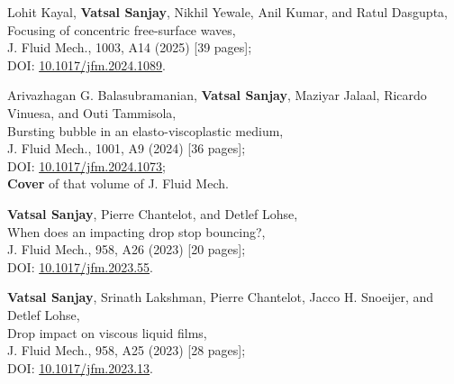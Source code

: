 \documentclass[10pt,a4paper,colorlinks,linkcolor=blue,urlcolor=blue,citecolor=blue]{moderncv}
\begin{document}
\begin{enumerate}[leftmargin=1.5em,label=\textbf{[\arabic*]}]
	\item Lohit Kayal, \textbf{Vatsal Sanjay}, Nikhil Yewale, Anil Kumar, and Ratul Dasgupta,\\
	Focusing of concentric free-surface waves,\\
	J. Fluid Mech., 1003, A14 (2025) [39 pages];\\
	\faFile\hspace{0.2em}DOI: \href{https://doi.org/10.1017/jfm.2024.1089}{10.1017/jfm.2024.1089}.

	\item Arivazhagan G. Balasubramanian, \textbf{Vatsal Sanjay}, Maziyar Jalaal, Ricardo Vinuesa, and Outi Tammisola,\\
	Bursting bubble in an elasto-viscoplastic medium,\\
	J. Fluid Mech., 1001, A9 (2024) [36 pages];\\
	\faFile\hspace{0.2em}DOI: \href{https://doi.org/10.1017/jfm.2024.1073}{10.1017/jfm.2024.1073};\\
	\faStar\hspace{0.2em}\textbf{Cover} of that volume of J. Fluid Mech.

	\item \textbf{Vatsal Sanjay}, Pierre Chantelot, and Detlef Lohse,\\
	When does an impacting drop stop bouncing?,\\
	J. Fluid Mech., 958, A26 (2023) [20 pages];\\
	\faFile\hspace{0.2em}DOI: \href{https://doi.org/10.1017/jfm.2023.55}{10.1017/jfm.2023.55}.

	\item \textbf{Vatsal Sanjay}, Srinath Lakshman, Pierre Chantelot, Jacco H. Snoeijer, and Detlef Lohse,\\
	Drop impact on viscous liquid films,\\
	J. Fluid Mech., 958, A25 (2023) [28 pages];\\
	\faFile\hspace{0.2em}DOI: \href{https://doi.org/10.1017/jfm.2023.13}{10.1017/jfm.2023.13}.


\end{enumerate}
\end{document}
